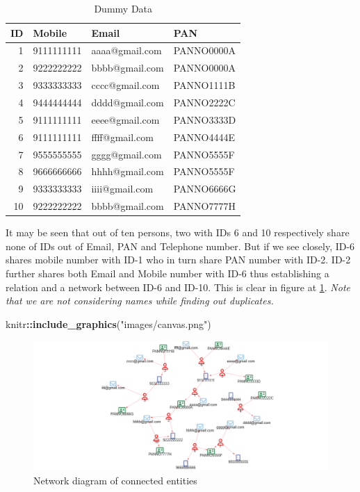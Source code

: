 \documentclass[
]{book}
\newenvironment{Shaded}{\begin{snugshade}}{\end{snugshade}}
\newcommand{\FunctionTok}[1]{\textcolor[rgb]{0.13,0.29,0.53}{\textbf{#1}}}
\newcommand{\NormalTok}[1]{#1}
\newcommand{\SpecialCharTok}[1]{\textcolor[rgb]{0.81,0.36,0.00}{\textbf{#1}}}
\newcommand{\StringTok}[1]{\textcolor[rgb]{0.31,0.60,0.02}{#1}}
\begin{document}
\begin{table}

\caption{\label{tab:gra101}Dummy Data}
\centering
\begin{tabular}[t]{r|l|l|l}
\hline
ID & Mobile & Email & PAN\\
\hline
1 & 9111111111 & aaaa@gmail.com & PANNO0000A\\
\hline
2 & 9222222222 & bbbb@gmail.com & PANNO0000A\\
\hline
3 & 9333333333 & cccc@gmail.com & PANNO1111B\\
\hline
4 & 9444444444 & dddd@gmail.com & PANNO2222C\\
\hline
5 & 9111111111 & eeee@gmail.com & PANNO3333D\\
\hline
6 & 9111111111 & ffff@gmail.com & PANNO4444E\\
\hline
7 & 9555555555 & gggg@gmail.com & PANNO5555F\\
\hline
8 & 9666666666 & hhhh@gmail.com & PANNO5555F\\
\hline
9 & 9333333333 & iiii@gmail.com & PANNO6666G\\
\hline
10 & 9222222222 & bbbb@gmail.com & PANNO7777H\\
\hline
\end{tabular}
\end{table}

It may be seen that out of ten persons, two with IDs 6 and 10 respectively share none of IDs out of Email, PAN and Telephone number. But if we see closely, ID-6 shares mobile number with ID-1 who in turn share PAN number with ID-2. ID-2 further shares both Email and Mobile number with ID-6 thus establishing a relation and a network between ID-6 and ID-10. This is clear in figure at \ref{fig:igraph11}. \emph{Note that we are not considering names while finding out duplicates.}

\begin{Shaded}
\begin{Highlighting}[]
\NormalTok{knitr}\SpecialCharTok{::}\FunctionTok{include\_graphics}\NormalTok{(}\StringTok{"images/canvas.png"}\NormalTok{)}
\end{Highlighting}
\end{Shaded}

\begin{figure}

{\centering \includegraphics[width=0.75\linewidth]{images/canvas} 

}

\caption{Network diagram of connected entities}\label{fig:igraph11}
\end{figure}
\end{document}
